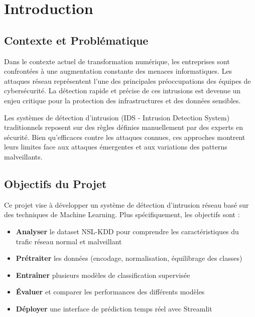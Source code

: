 \documentclass[12pt,a4paper]{article}
\begin{document}
\newpage
\tableofcontents
\newpage

\section{Introduction}

\subsection{Contexte et Problématique}

Dans le contexte actuel de transformation numérique, les entreprises sont confrontées à une augmentation constante des menaces informatiques. Les attaques réseau représentent l'une des principales préoccupations des équipes de cybersécurité. La détection rapide et précise de ces intrusions est devenue un enjeu critique pour la protection des infrastructures et des données sensibles.

Les systèmes de détection d'intrusion (IDS - Intrusion Detection System) traditionnels reposent sur des règles définies manuellement par des experts en sécurité. Bien qu'efficaces contre les attaques connues, ces approches montrent leurs limites face aux attaques émergentes et aux variations des patterns malveillants.

\subsection{Objectifs du Projet}

Ce projet vise à développer un système de détection d'intrusion réseau basé sur des techniques de Machine Learning. Plus spécifiquement, les objectifs sont :

\begin{itemize}
    \item \textbf{Analyser} le dataset NSL-KDD pour comprendre les caractéristiques du trafic réseau normal et malveillant
    \item \textbf{Prétraiter} les données (encodage, normalisation, équilibrage des classes)
    \item \textbf{Entraîner} plusieurs modèles de classification supervisée
    \item \textbf{Évaluer} et comparer les performances des différents modèles
    \item \textbf{Déployer} une interface de prédiction temps réel avec Streamlit
\end{itemize}
\end{document}
